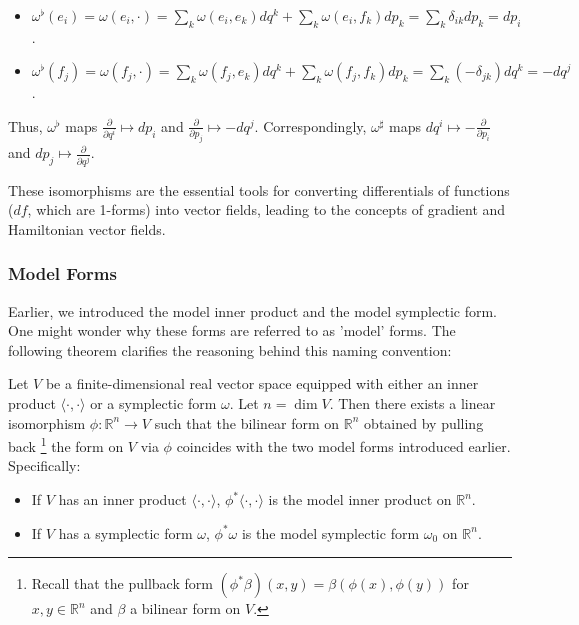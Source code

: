 \begin{itemize}
    \item $\omega^\flat(e_i) = \omega(e_i, \cdot) = \sum_k \omega(e_i, e_k) dq^k + \sum_k \omega(e_i, f_k) dp_k = \sum_k \delta_{ik} dp_k = dp_i$.
    \item $\omega^\flat(f_j) = \omega(f_j, \cdot) = \sum_k \omega(f_j, e_k) dq^k + \sum_k \omega(f_j, f_k) dp_k = \sum_k (-\delta_{jk}) dq^k = -dq^j$.
\end{itemize}

Thus, $\omega^\flat$ maps $\frac{\partial}{\partial q^i} \mapsto dp_i$ and $\frac{\partial}{\partial p_j} \mapsto -dq^j$. Correspondingly, $\omega^\sharp$ maps $dq^i \mapsto - \frac{\partial}{\partial p_i}$ and $dp_j \mapsto \frac{\partial}{\partial q^j}$.

These isomorphisms are the essential tools for converting differentials of functions ($df$, which are 1-forms) into vector fields, leading to the concepts of gradient and Hamiltonian vector fields.

\subsubsection{Model Forms}
Earlier, we introduced the model inner product and the model symplectic form. One might wonder why these forms are referred to as 'model' forms. The following theorem clarifies the reasoning behind this naming convention:

\begin{theorem} \label{thm:normal_form}
Let $V$ be a finite-dimensional real vector space equipped with either an inner product $\langle \cdot, \cdot \rangle$ or a symplectic form $\omega$. Let $n = \dim V$. Then there exists a linear isomorphism $\phi: \mathbb{R}^n \to V$ such that the bilinear form on $\mathbb{R}^n$ obtained by pulling back \footnote{Recall that the pullback form $(\phi^* \beta)(x, y) = \beta(\phi(x), \phi(y))$ for $x, y \in \mathbb{R}^n$ and $\beta$ a bilinear form on $V$.} the form on $V$ via $\phi$ coincides with the two model forms introduced earlier. Specifically:
\begin{itemize}
    \item If $V$ has an inner product $\langle \cdot, \cdot \rangle$, $\phi^* \langle \cdot, \cdot \rangle$ is the model inner product on $\mathbb{R}^n$.
    \item If $V$ has a symplectic form $\omega$, $\phi^* \omega$ is the model symplectic form $\omega_0$ on $\mathbb{R}^n$.
\end{itemize}
\end{theorem}

